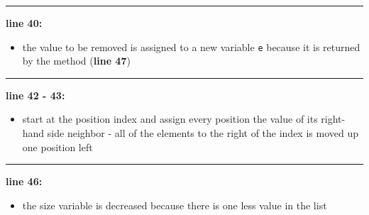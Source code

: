 \vspace{0.1cm}
\noindent
\textcolor{RedOrange}{\rule{\textwidth}{0.5pt}}
\vspace{-0.1cm}

\noindent
\begin{minipage}{0.15\textwidth}
    \textcolor{RedOrange}{\textbf{line 40:}}
\end{minipage}
\begin{minipage}{0.85\textwidth}
    \begin{itemize}
        \item[] the value to be removed is assigned to a new variable \texttt{e} because it is returned by the method (\textcolor{RedOrange}{\textbf{line 47}})
    \end{itemize}
\end{minipage}

\vspace{0.1cm}
\noindent
\textcolor{RedOrange}{\rule{\textwidth}{0.5pt}}
\vspace{-0.1cm}

\noindent
\begin{minipage}{0.15\textwidth}
    \textcolor{RedOrange}{\textbf{line 42 - 43:}}
\end{minipage}
\begin{minipage}{0.85\textwidth}
    \begin{itemize}
        \item[] start at the position index and assign every position the value of its right-hand side neighbor - all of the elements to the right of the index is moved up one position left
    \end{itemize}
\end{minipage}

\vspace{0.1cm}
\noindent
\textcolor{RedOrange}{\rule{\textwidth}{0.5pt}}
\vspace{-0.1cm}

\noindent
\begin{minipage}{0.15\textwidth}
    \textcolor{RedOrange}{\textbf{line 46:}}
\end{minipage}
\begin{minipage}{0.85\textwidth}
    \begin{itemize}
        \item[] the size variable is decreased because there is one less value in the list
    \end{itemize}
\end{minipage}


